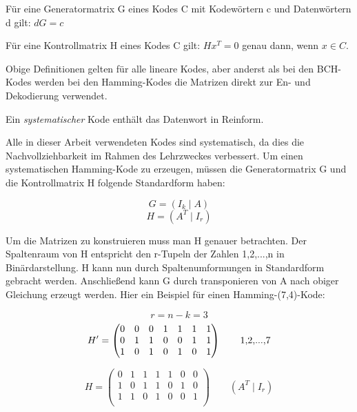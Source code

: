 \begin{t_def}
Für eine Generatormatrix G eines Kodes C mit Kodewörtern c und Datenwörtern d gilt: $ dG = c$
\end{t_def}

\begin{t_def}
Für eine Kontrollmatrix H eines Kodes C gilt: $ Hx^T = 0$ genau dann, wenn $x \in C$.
\end{t_def}

Obige Definitionen gelten für alle lineare Kodes\cite[Kap. 1.2]{huffman2010fundamentals}, aber anderst als bei den BCH-Kodes werden bei den Hamming-Kodes die Matrizen direkt zur En- und Dekodierung verwendet.

\begin{t_def}
Ein {\em systematischer} Kode enthält das Datenwort in Reinform.
\end{t_def}

Alle in dieser Arbeit verwendeten Kodes sind systematisch, da dies die Nachvollziehbarkeit im Rahmen des Lehrzweckes verbessert. Um einen systematischen Hamming-Kode zu erzeugen, müssen die Generatormatrix G und die Kontrollmatrix H folgende Standardform\cite[Kap. 1.1.3]{morelos2006art} haben: 

$$G = \left(I_k \mid A\right)$$
$$H = \left(A^T \mid I_r\right)$$

Um die Matrizen zu konstruieren muss man H genauer betrachten. Der Spaltenraum von H entspricht den r-Tupeln der Zahlen 1,2,...,n in Binärdarstellung. H kann nun durch Spaltenumformungen in Standardform gebracht werden. 
Anschließend kann G durch transponieren von A nach obiger Gleichung erzeugt werden.\cite[Kap. 1.8]{huffman2010fundamentals} Hier ein Beispiel für einen Hamming-(7,4)-Kode:

$$r = n-k = 3$$
$$H' = \begin{pmatrix}
0 & 0 & 0 & 1 & 1 & 1 & 1 \\
0 & 1 & 1 & 0 & 0 & 1 & 1 \\
1 & 0 & 1 & 0 & 1 & 0 & 1 \\
\end{pmatrix}\text{\qquad{1,2,...,7}}$$

$$H = \begin{pmatrix}
0 & 1 & 1 & 1 & 1 & 0 & 0 \\
1 & 0 & 1 & 1 & 0 & 1 & 0 \\
1 & 1 & 0 & 1 & 0 & 0 & 1 \\
\end{pmatrix}\qquad{(A^T \mid I_r)}$$

